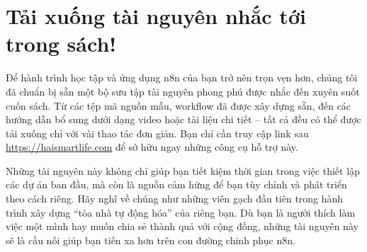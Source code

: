 \documentclass[a4paper,12pt,oneside]{book}
\begin{document}
\newpage
\thispagestyle{empty}

\section*{Tải xuống tài nguyên nhắc tới trong sách!}

\begin{center}

\end{center}


Để hành trình học tập và ứng dụng n8n của bạn trở nên trọn vẹn hơn, chúng tôi đã chuẩn bị sẵn một bộ sưu tập tài nguyên phong phú được nhắc đến xuyên suốt cuốn sách. Từ các tệp mã nguồn mẫu, workflow đã được xây dựng sẵn, đến các hướng dẫn bổ sung dưới dạng video hoặc tài liệu chi tiết – tất cả đều có thể được tải xuống chỉ với vài thao tác đơn giản. Bạn chỉ cần truy cập link sau \href{https://haismartlife.com}{https://haismartlife.com} để sở hữu ngay những công cụ hỗ trợ này.

Những tài nguyên này không chỉ giúp bạn tiết kiệm thời gian trong việc thiết lập các dự án ban đầu, mà còn là nguồn cảm hứng để bạn tùy chỉnh và phát triển theo cách riêng. Hãy nghĩ về chúng như những viên gạch đầu tiên trong hành trình xây dựng “tòa nhà tự động hóa” của riêng bạn. Dù bạn là người thích làm việc một mình hay muốn chia sẻ thành quả với cộng đồng, những tài nguyên này sẽ là cầu nối giúp bạn tiến xa hơn trên con đường chinh phục n8n.
\end{document}
